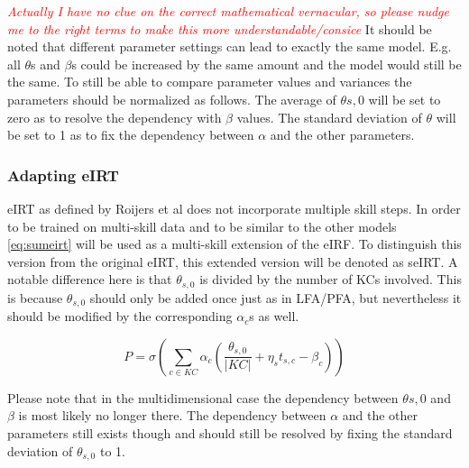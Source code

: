 \documentclass{scrartcl}
\newcommand\todo[1]{\textit{\textcolor{red}{#1}}}
\begin{document}
\todo{Actually I have no clue on the correct mathematical vernacular, so please nudge me to the right terms to make this more understandable/consice}
It should be noted that different parameter settings can lead to exactly the same model. E.g. all $\theta$s and $\beta$s could be increased by the same amount and the model would still be the same. To still be able to compare parameter values and variances the parameters should be normalized as follows. The average of $\theta{s,0}$ will be set to zero as to resolve the dependency with $\beta$ values. The standard deviation of $\theta$ will be set to 1 as to fix the dependency between $\alpha$ and the other parameters.

\subsubsection{Adapting eIRT}
eIRT as defined by Roijers et al does not incorporate multiple skill steps. In order to be trained on multi-skill data and to be similar to the other models \ref{eq:sumeirt} will be used as a multi-skill extension of the eIRF. To distinguish this version from the original eIRT, this extended version will be denoted as seIRT. A notable difference here is that $\theta_{s,0}$ is divided by the number of KCs involved. This is because $\theta_{s,0}$ should only be added once just as in LFA/PFA, but nevertheless it should be modified by the corresponding $\alpha_{c}$s as well.

\begin{equation}
\label{eq:sumeirt}
P = \sigma(\sum_{c \in KC} \alpha_{c}(\frac{\theta_{s,0}}{|KC|} + \eta_{s} t_{s,c} - \beta_{c}))
\end{equation}

Please note that in the multidimensional case the dependency between $\theta{s,0}$ and $\beta$ is most likely no longer there. The dependency between $\alpha$ and the other parameters still exists though and should still be resolved by fixing the standard deviation of $\theta_{s,0}$ to 1.
\end{document}
